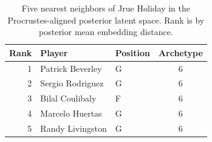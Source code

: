 \begin{table}[htbp]
  \centering\small
  \begin{tabular}{rllc}
    \toprule
    Rank & Player & Position & Archetype \\
    \midrule
    1 & Patrick Beverley & G & 6 \\
    2 & Sergio Rodriguez & G & 6 \\
    3 & Bilal Coulibaly & F & 6 \\
    4 & Marcelo Huertas & G & 6 \\
    5 & Randy Livingston & G & 6 \\
    \bottomrule
  \end{tabular}
  \caption{Five nearest neighbors of Jrue Holiday in the Procrustes-aligned posterior latent space. Rank is by posterior mean embedding distance.}
  \label{tab:Jrue_Holiday_neighbors}
\end{table}

